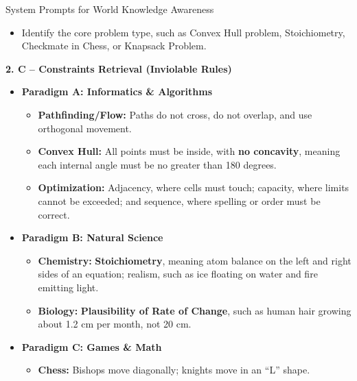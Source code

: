 \documentclass{llmxive}
\begin{document}
\begin{promptbox}[label={System Prompts: WA}]{System Prompts for World Knowledge Awareness}
\begin{itemize}[leftmargin=2.2em, labelsep=0.5em, itemsep=2pt]
    \item Identify the core problem type, such as Convex Hull problem, Stoichiometry, Checkmate in Chess, or Knapsack Problem.
\end{itemize}

\medskip

\textbf{2. C -- Constraints Retrieval (Inviolable Rules)}

\begin{itemize}[leftmargin=2.2em, labelsep=0.5em, itemsep=2pt]
    \item \textbf{Paradigm A: Informatics \& Algorithms}
    
    \begin{itemize}[leftmargin=2.2em, labelsep=0.5em, itemsep=2pt]
        \item \textbf{Pathfinding/Flow:} Paths do not cross, do not overlap, and use orthogonal movement.
        
        \item \textbf{Convex Hull:} All points must be inside, with \textbf{no concavity}, meaning each internal angle must be no greater than 180 degrees.
        
        \item \textbf{Optimization:} Adjacency, where cells must touch; capacity, where limits cannot be exceeded; and sequence, where spelling or order must be correct.
    \end{itemize}
    
    \item \textbf{Paradigm B: Natural Science}
    
    \begin{itemize}[leftmargin=2.2em, labelsep=0.5em, itemsep=2pt]
        \item \textbf{Chemistry:} \textbf{Stoichiometry}, meaning atom balance on the left and right sides of an equation; realism, such as ice floating on water and fire emitting light.
        
        \item \textbf{Biology:} \textbf{Plausibility of Rate of Change}, such as human hair growing about 1.2 cm per month, not 20 cm.
    \end{itemize}
    
    \item \textbf{Paradigm C: Games \& Math}
    
    \begin{itemize}[leftmargin=2.2em, labelsep=0.5em, itemsep=2pt]
        \item \textbf{Chess:} Bishops move diagonally; knights move in an ``L'' shape.
        

\end{itemize}
\end{itemize}
\end{promptbox}
\end{document}
